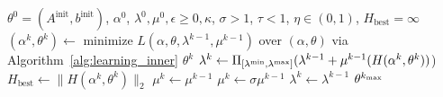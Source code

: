 \begin{algorithm}[ht]
	\caption{Safeguarded stochastic augmented Lagrangian algorithm to solve~\eqref{eq:bilevel_sampled}}
	\label{alg:learning}
	\begin{algorithmic}[1]
	  $\theta^0 = (A^{\text{init}},b^{\text{init}})$, $\alpha^0$, $\lambda^0, \mu^0,\epsilon \geq 0,\kappa$, $\sigma > 1$, $\tau < 1$, $\eta \in (0,1)$, $H_{\text{best}} = \infty$
  \State $(\alpha^{k}, \theta^{k}) \gets$ minimize $L(\alpha, \theta, \lambda^{k-1}, \mu^{k-1})$ over $(\alpha, \theta)$ via Algorithm~\ref{alg:learning_inner}
   $\theta^{k}$ 
	 \State $\lambda^{k} \gets  \Pi_{[{\lambda^{\rm{min}}}, \lambda^{\rm{max}}]}(\lambda^{k-1} + \mu^{k-1}(H(\alpha^{k},\theta^{k}))$) 
    \State $H_{\text{best}} \gets \|H(\alpha^{k},\theta^{k}) \|_2$
    \State $\mu^{k} \gets  \mu^{k-1}$
    \Else
	 \State $\mu^{k} \gets  \sigma\mu^{k-1}$ 
    \State $\lambda^{k} \gets \lambda^{k-1}$
    \EndIf
	 \EndFor
	  $\theta^{k_{\rm max}}$
	\end{algorithmic}
\end{algorithm} 
